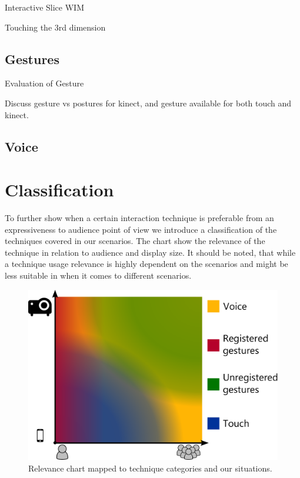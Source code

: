 \documentclass[review,journal]{vgtc}         %
\begin{document}
Interactive Slice WIM \cite{Coffey:2012:ISW:2360744.2360843}


Touching the 3rd dimension \cite{DBLP:journals/dagstuhl-reports/KeefeKSR12}

\subsection{Gestures}

Evaluation of Gesture \cite{Kirmizibayrak:2011:EGB:2087756.2087764}

Discuss gesture vs postures \cite{isenberg:hal-00781237} for kinect, and gesture available for both touch and kinect.

\subsection{Voice}

\section{Classification}

To further show when a certain interaction technique is preferable from an expressiveness to audience point of view we introduce a classification of the techniques covered in our scenarios. The chart show the relevance of the technique in relation to audience and display size. It should be noted, that while a technique usage relevance is highly dependent on the scenarios and might be less suitable in when it comes to different scenarios.

\begin{figure}[htb]
	\centering
	\includegraphics[width=1.0\linewidth]{classification.pdf}
	\caption{Relevance chart mapped to technique categories and our situations.}
	\label{classifiy_diagram}
\end{figure}
\end{document}
